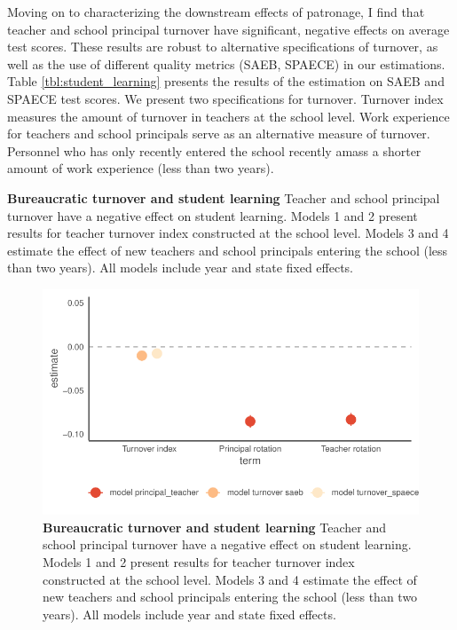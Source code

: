 \documentclass[12pt,a4paper]{article}
\begin{document}
Moving on to characterizing the downstream effects of patronage, I find that teacher and school principal turnover have significant, negative effects on average test scores. These results are robust to alternative specifications of turnover, as well as the use of different quality metrics (SAEB, SPAECE) in our estimations. Table \ref{tbl:student_learning} presents the results of the estimation on SAEB and SPAECE test scores. We present two specifications for turnover. Turnover index measures the amount of turnover in teachers at the school level. Work experience for teachers and school principals serve as an alternative measure of turnover. Personnel who has only recently entered the school recently amass a shorter amount of work experience (less than two years).

\begin{landscape}
    \begin{table}[t]
      \centering
      \footnotesize
      
      \caption{{\bf Bureaucratic turnover and student learning} Teacher and school principal turnover have a negative effect on student learning. Models 1 and 2 present results for teacher turnover index constructed at the school level. Models 3 and 4 estimate the effect of new teachers and school principals entering the school (less than two years). All models include year and state fixed effects.}
      \label{tbl:student_learning}
    \end{table}
\end{landscape}



\begin{figure}[h]
  \centering
  \footnotesize
  \includegraphics{plots/model_turnover_learning.pdf}
  \caption{{\bf Bureaucratic turnover and student learning} Teacher and school principal turnover have a negative effect on student learning. Models 1 and 2 present results for teacher turnover index constructed at the school level. Models 3 and 4 estimate the effect of new teachers and school principals entering the school (less than two years). All models include year and state fixed effects.}
  \label{fig:hlm_mods}
\end{figure}
\end{document}
